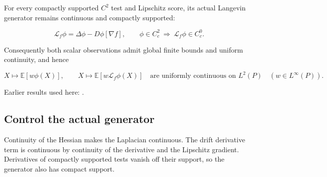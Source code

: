 \documentclass[11pt,a4paper]{report}
\begin{document}
For every compactly supported \(C^2\) test and Lipschitz score, its actual Langevin generator remains continuous and compactly supported:


\[\mathcal L_f\phi=\Delta\phi-D\phi[\nabla f],\qquad
\phi\in C_c^2\ \Longrightarrow\ \mathcal L_f\phi\in C_c^0.\]


Consequently both scalar observations admit global finite bounds and uniform continuity, and hence


\[X\longmapsto\mathbb E[w\phi(X)],\qquad
X\longmapsto\mathbb E[w\mathcal L_f\phi(X)]
\quad\text{are uniformly continuous on }L^2(P)
\quad (w\in L^\infty(P)).\]

Earlier results used here: \cite[Section~3.46]{LangevinLean2026ULASC}.
\subsection{\texorpdfstring{Control the actual generator}{Control the actual generator}}
\label{report-step-AverageLMC-LaplacianCompactTest-lean-1}


Continuity of the Hessian makes the Laplacian continuous. The drift derivative term is continuous by continuity of the derivative and the Lipschitz gradient. Derivatives of compactly supported tests vanish off their support, so the generator also has compact support.
\end{document}
